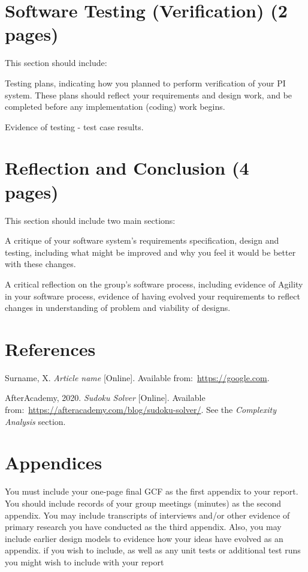 \documentclass[12pt]{article}
\begin{document}
\section{Software Testing (Verification) (2 pages)}

This section should include:

Testing plans, indicating how you planned to perform verification of your PI system.
These plans should reflect your requirements and design work, and be completed
before any implementation (coding) work begins.

Evidence of testing - test case results.


\section{Reflection and Conclusion (4 pages)}

This section should include two main sections:

A critique of your software system’s requirements specification, design and testing,
including what might be improved and why you feel it would be better with these
changes.

A critical reflection on the group’s software process, including evidence of Agility in
your software process, evidence of having evolved your requirements to reflect
changes in understanding of problem and viability of designs.


\section{References}

\renewcommand{\refname}{} 
\vspace{-20pt}
\begin{thebibliography}{99}
     Surname, X. \textit{Article name} [Online].
    Available from:~\url{https://google.com}.

     AfterAcademy, 2020. \textit{Sudoku Solver} [Online].
    Available from:~\url{https://afteracademy.com/blog/sudoku-solver/}. See the
    \textit{Complexity Analysis} section.
\end{thebibliography}


\section{Appendices}
You must include your one-page final GCF as the first appendix to your report. You should
include records of your group meetings (minutes) as the second appendix. You may include
transcripts of interviews and/or other evidence of primary research you have conducted as
the third appendix.
Also, you may include earlier design models to evidence how your ideas have evolved as an
appendix. if you wish to include, as well as any unit tests or additional test runs you might
wish to include with your report
\end{document}

